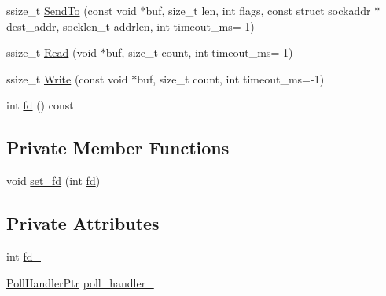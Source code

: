\begin{DoxyCompactItemize}
\item 
ssize\-\_\-t \hyperlink{classapollo_1_1cyber_1_1io_1_1Session_a361b3065cbc772e9b450f0d045d1af54}{Send\-To} (const void $\ast$buf, size\-\_\-t len, int flags, const struct sockaddr $\ast$dest\-\_\-addr, socklen\-\_\-t addrlen, int timeout\-\_\-ms=-\/1)
\item 
ssize\-\_\-t \hyperlink{classapollo_1_1cyber_1_1io_1_1Session_aa28b60a206add6a1b29ebb37d09960ab}{Read} (void $\ast$buf, size\-\_\-t count, int timeout\-\_\-ms=-\/1)
\item 
ssize\-\_\-t \hyperlink{classapollo_1_1cyber_1_1io_1_1Session_a19b4a2e7a1c974f0263848ce65ce8efb}{Write} (const void $\ast$buf, size\-\_\-t count, int timeout\-\_\-ms=-\/1)
\item 
int \hyperlink{classapollo_1_1cyber_1_1io_1_1Session_aec8faaa2371913967925e7252a02e985}{fd} () const 
\end{DoxyCompactItemize}
\subsection*{Private Member Functions}
\begin{DoxyCompactItemize}
\item 
void \hyperlink{classapollo_1_1cyber_1_1io_1_1Session_aeb9e5bf778ab9a2fab584124e714a08e}{set\-\_\-fd} (int \hyperlink{classapollo_1_1cyber_1_1io_1_1Session_aec8faaa2371913967925e7252a02e985}{fd})
\end{DoxyCompactItemize}
\subsection*{Private Attributes}
\begin{DoxyCompactItemize}
\item 
int \hyperlink{classapollo_1_1cyber_1_1io_1_1Session_a188d2acea391719dc4c81e9ded481fec}{fd\-\_\-}
\item 
\hyperlink{classapollo_1_1cyber_1_1io_1_1Session_a24c58eb44ed5df020876be84cdb071a5}{Poll\-Handler\-Ptr} \hyperlink{classapollo_1_1cyber_1_1io_1_1Session_a38513802b0eb309fc7b34749859eb87c}{poll\-\_\-handler\-\_\-}
\end{DoxyCompactItemize}


